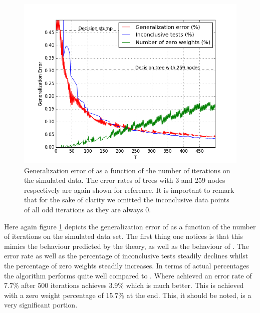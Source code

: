 \begin{figure}[!ht]
  \centering
      \includegraphics[width=\graphWidth]{generated/NHGD.png}
  \caption{Generalization error of \NHB as a function of the number of iterations on the simulated data. The error rates of trees with 3 and 259 nodes respectively are again shown for reference. It is important to remark that for the sake of clarity we omitted the inconclusive data points of all odd iterations as they are always 0.}
      \label{fig:NHBGD}
\end{figure}
 \FloatBarrier
 \par Here again figure \ref{fig:NHBGD} depicts the generalization error of \NHB as a function of the number of iterations on the simulated data set. The first thing one notices is that this mimics the behaviour predicted by the theory, as well as the behaviour of \adaB. The error rate as well as the percentage of inconclusive tests steadily declines whilst the percentage of zero weights steadily increases. In terms of actual percentages the algorithm performs quite well compared to \adaB. Where \adaB achieved an error rate of 7.7\% after 500 iterations \NHB achieves 3.9\% which is much better. This is achieved with a zero weight percentage of 15.7\% at the end. This, it should be noted, is a very significant portion. 
